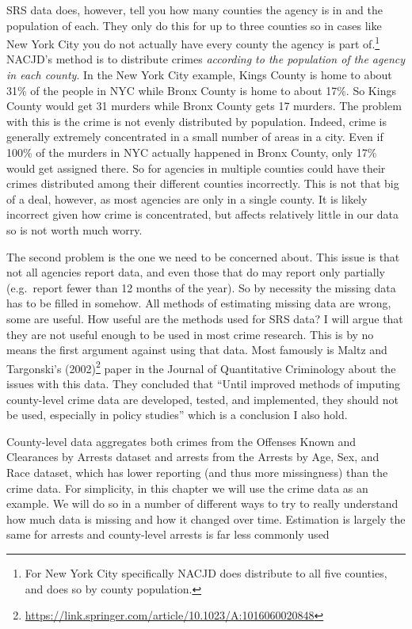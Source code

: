 \documentclass[
]{krantz}
\renewcommand{\href}[2]{#2\footnote{\url{#1}}}
\begin{document}
SRS data does, however, tell you how many counties the
agency is in and the population of each. They only do this
for up to three counties so in cases like New York City you
do not actually have every county the agency is part
of.\footnote{For New York City specifically NACJD does
  distribute to all five counties, and does so by county
  population.} NACJD's method is to distribute crimes
\emph{according to the population of the agency in each
county}. In the New York City example, Kings County is home
to about 31\% of the people in NYC while Bronx County is
home to about 17\%. So Kings County would get 31 murders
while Bronx County gets 17 murders. The problem with this is
the crime is not evenly distributed by population. Indeed,
crime is generally extremely concentrated in a small number
of areas in a city. Even if 100\% of the murders in NYC
actually happened in Bronx County, only 17\% would get
assigned there. So for agencies in multiple counties could
have their crimes distributed among their different counties
incorrectly. This is not that big of a deal, however, as
most agencies are only in a single county. It is likely
incorrect given how crime is concentrated, but affects
relatively little in our data so is not worth much worry.

The second problem is the one we need to be concerned about.
This issue is that not all agencies report data, and even
those that do may report only partially (e.g.~report fewer
than 12 months of the year). So by necessity the missing
data has to be filled in somehow. All methods of estimating
missing data are wrong, some are useful. How useful are the
methods used for SRS data? I will argue that they are not
useful enough to be used in most crime research. This is by
no means the first argument against using that data. Most
famously is
\href{https://link.springer.com/article/10.1023/A:1016060020848}{Maltz
and Targonski's (2002)} paper in the Journal of Quantitative
Criminology about the issues with this data. They concluded
that ``Until improved methods of imputing county-level crime
data are developed, tested, and implemented, they should not
be used, especially in policy studies'' which is a
conclusion I also hold.

County-level data aggregates both crimes from the Offenses
Known and Clearances by Arrests dataset and arrests from the
Arrests by Age, Sex, and Race dataset, which has lower
reporting (and thus more missingness) than the crime data.
For simplicity, in this chapter we will use the crime data
as an example. We will do so in a number of different ways
to try to really understand how much data is missing and how
it changed over time. Estimation is largely the same for
arrests and county-level arrests is far less commonly used
\end{document}

